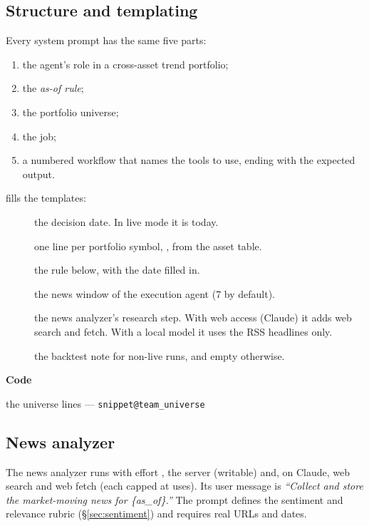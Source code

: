 \documentclass[11pt,a4paper]{article}
\makeatletter
\newcommand{\snippetsource}[1]{\csname snippet@#1\endcsname}
\newcommand{\snippet}[3]{%
  }
\newcommand{\prompt}[2]{%
  }
\newenvironment{codepointers}{%
  \par\smallskip\begingroup\footnotesize\noindent\textcolor{blue!50!black}{\textbf{Code}}\par\nopagebreak
  \begin{list}{}{\setlength{\leftmargin}{1.2em}\setlength{\itemsep}{0pt}\setlength{\parsep}{0pt}\setlength{\topsep}{1pt}}}%
  {\end{list}\endgroup\smallskip}
\newcommand{\codeitem}[2]{\item #2 --- \texttt{\snippetsource{#1}}}
\makeatother
\begin{document}
\subsection{Structure and templating}
Every system prompt has the same five parts:
\begin{enumerate}
  \item the agent's role in a cross-asset trend portfolio;
  \item the \emph{as-of rule};
  \item the portfolio universe;
  \item the job;
  \item a numbered workflow that names the tools to use, ending with the expected output.
\end{enumerate}
 fills the templates:
\begin{description}
  \item[] the decision date. In live mode it is today.
  \item[] one line per portfolio symbol, ,
        from the asset table.
  \item[] the rule below, with the date filled in.
  \item[] the news window of the execution agent (7 by default).
  \item[] the news analyzer's research step. With web access (Claude) it
        adds web search and fetch. With a local model it uses the RSS headlines only.
  \item[] the backtest note for non-live runs, and empty otherwise.
\end{description}
\prompt{as_of_rule}{The as-of rule (in every system prompt)}
\snippet{team_fill}{Python}{Template filling}
\begin{codepointers}
  \codeitem{team_universe}{the universe lines}
\end{codepointers}

\subsection{News analyzer}
The news analyzer runs with effort , the  server (writable) and, on
Claude, web search and web fetch (each capped at  uses). Its user
message is \emph{``Collect and store the market-moving news for \{as\_of\}.''} The prompt
defines the sentiment and relevance rubric (\S\ref{sec:sentiment}) and requires real URLs
and dates.
\prompt{news_system}{News analyzer system prompt (template)}
\end{document}
